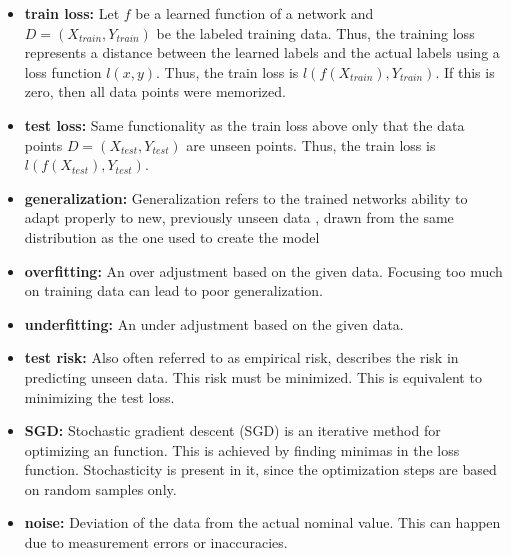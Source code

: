 \begin{itemize}
    \item{\textbf{train loss:}}
    Let $f$ be a learned function of a network and $D = (X_{train},Y_{train})$ be the labeled training data. Thus, the training loss represents a distance between the learned labels and the actual labels using a loss function $l(x,y)$. Thus, the train loss is $l(f(X_{train}),Y_{train})$. If this is zero, then all data points were memorized.
    
    \item{\textbf{test loss:}}
    Same functionality  as the train loss above only that the data points $D = (X_{test},Y_{test})$ are unseen points. Thus, the train loss is $l(f(X_{test}),Y_{test})$.
    
    \item{\textbf{generalization:}}
    Generalization refers to the trained networks ability to adapt properly to new, previously unseen data , drawn from the same distribution as the one used to create the model
    
    \item{\textbf{overfitting:}}
    An over adjustment based on the given data. Focusing too much on training data can lead to poor generalization.
    
    \item{\textbf{underfitting:}}
    An under adjustment based on the given data.
    
    \item{\textbf{test risk:}}
    Also often referred to as empirical risk, describes the risk in predicting unseen data. This risk must be minimized. This is equivalent to minimizing the test loss.
    
    \item{\textbf{SGD:}}
    Stochastic gradient descent (SGD) is an iterative method for optimizing an function. This is achieved by finding minimas in the loss function. Stochasticity is present in it, since the optimization steps are based on random samples only.
    
    \item{\textbf{noise:}}
    Deviation of the data from the actual nominal value. This can happen due to measurement errors or inaccuracies. 
\end{itemize}






